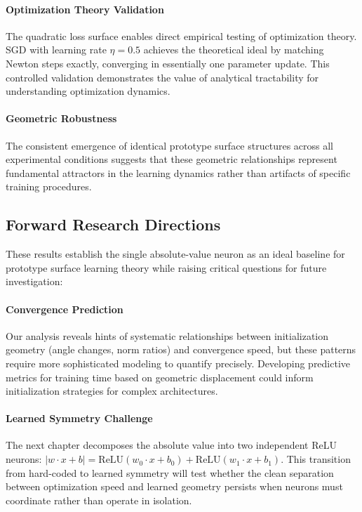 \paragraph{Optimization Theory Validation}
The quadratic loss surface enables direct empirical testing of optimization theory. SGD with learning rate $\eta=0.5$ achieves the theoretical ideal by matching Newton steps exactly, converging in essentially one parameter update. This controlled validation demonstrates the value of analytical tractability for understanding optimization dynamics.

\paragraph{Geometric Robustness}
The consistent emergence of identical prototype surface structures across all experimental conditions suggests that these geometric relationships represent fundamental attractors in the learning dynamics rather than artifacts of specific training procedures.

\subsection*{Forward Research Directions}
These results establish the single absolute-value neuron as an ideal baseline for prototype surface learning theory while raising critical questions for future investigation:

\paragraph{Convergence Prediction}
Our analysis reveals hints of systematic relationships between initialization geometry (angle changes, norm ratios) and convergence speed, but these patterns require more sophisticated modeling to quantify precisely. Developing predictive metrics for training time based on geometric displacement could inform initialization strategies for complex architectures.

\paragraph{Learned Symmetry Challenge}
The next chapter decomposes the absolute value into two independent ReLU neurons: $|w \cdot x + b| = \text{ReLU}(w_0 \cdot x + b_0) + \text{ReLU}(w_1 \cdot x + b_1)$. This transition from hard-coded to learned symmetry will test whether the clean separation between optimization speed and learned geometry persists when neurons must coordinate rather than operate in isolation.

